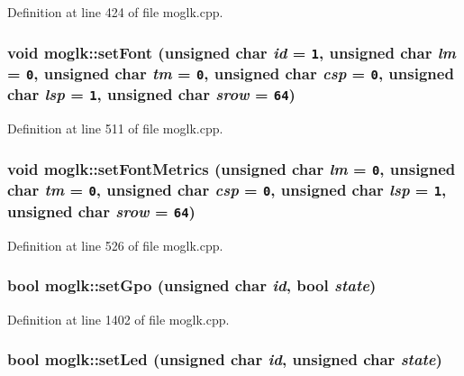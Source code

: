 Definition at line 424 of file moglk.cpp.\hypertarget{classmoglk_cfb8813e8db8de6ef0f34e479952589b}{
\subsubsection[{setFont}]{\setlength{\rightskip}{0pt plus 5cm}void moglk::setFont (unsigned char {\em id} = {\tt 1}, \/  unsigned char {\em lm} = {\tt 0}, \/  unsigned char {\em tm} = {\tt 0}, \/  unsigned char {\em csp} = {\tt 0}, \/  unsigned char {\em lsp} = {\tt 1}, \/  unsigned char {\em srow} = {\tt 64})}}
\label{classmoglk_cfb8813e8db8de6ef0f34e479952589b}




Definition at line 511 of file moglk.cpp.\hypertarget{classmoglk_17c4f023df63951df9f19f08c56f8786}{
\subsubsection[{setFontMetrics}]{\setlength{\rightskip}{0pt plus 5cm}void moglk::setFontMetrics (unsigned char {\em lm} = {\tt 0}, \/  unsigned char {\em tm} = {\tt 0}, \/  unsigned char {\em csp} = {\tt 0}, \/  unsigned char {\em lsp} = {\tt 1}, \/  unsigned char {\em srow} = {\tt 64})}}
\label{classmoglk_17c4f023df63951df9f19f08c56f8786}




Definition at line 526 of file moglk.cpp.\hypertarget{classmoglk_4acb0355df560236b463eb323a61f182}{
\subsubsection[{setGpo}]{\setlength{\rightskip}{0pt plus 5cm}bool moglk::setGpo (unsigned char {\em id}, \/  bool {\em state})}}
\label{classmoglk_4acb0355df560236b463eb323a61f182}




Definition at line 1402 of file moglk.cpp.\hypertarget{classmoglk_7a9fe2fe9dd14ac41e4c2429a5ba1312}{
\subsubsection[{setLed}]{\setlength{\rightskip}{0pt plus 5cm}bool moglk::setLed (unsigned char {\em id}, \/  unsigned char {\em state})}}
\label{classmoglk_7a9fe2fe9dd14ac41e4c2429a5ba1312}




